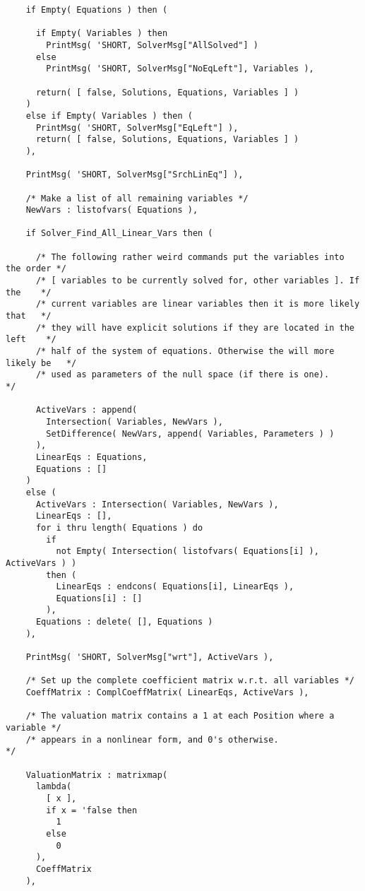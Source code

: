 \begin{verbatim}
    if Empty( Equations ) then (

      if Empty( Variables ) then
        PrintMsg( 'SHORT, SolverMsg["AllSolved"] )
      else
        PrintMsg( 'SHORT, SolverMsg["NoEqLeft"], Variables ),

      return( [ false, Solutions, Equations, Variables ] )
    )
    else if Empty( Variables ) then (
      PrintMsg( 'SHORT, SolverMsg["EqLeft"] ),
      return( [ false, Solutions, Equations, Variables ] )
    ),

    PrintMsg( 'SHORT, SolverMsg["SrchLinEq"] ),

    /* Make a list of all remaining variables */
    NewVars : listofvars( Equations ),

    if Solver_Find_All_Linear_Vars then (

      /* The following rather weird commands put the variables into the order */
      /* [ variables to be currently solved for, other variables ]. If the    */
      /* current variables are linear variables then it is more likely that   */
      /* they will have explicit solutions if they are located in the left    */
      /* half of the system of equations. Otherwise the will more likely be   */
      /* used as parameters of the null space (if there is one).              */

      ActiveVars : append(
        Intersection( Variables, NewVars ),
        SetDifference( NewVars, append( Variables, Parameters ) )
      ),
      LinearEqs : Equations,
      Equations : []
    )
    else (
      ActiveVars : Intersection( Variables, NewVars ),
      LinearEqs : [],
      for i thru length( Equations ) do
        if
          not Empty( Intersection( listofvars( Equations[i] ), ActiveVars ) )
        then (
          LinearEqs : endcons( Equations[i], LinearEqs ),
          Equations[i] : []
        ),
      Equations : delete( [], Equations )
    ),

    PrintMsg( 'SHORT, SolverMsg["wrt"], ActiveVars ),

    /* Set up the complete coefficient matrix w.r.t. all variables */
    CoeffMatrix : ComplCoeffMatrix( LinearEqs, ActiveVars ),

    /* The valuation matrix contains a 1 at each Position where a variable */
    /* appears in a nonlinear form, and 0's otherwise.                     */

    ValuationMatrix : matrixmap(
      lambda(
        [ x ],
        if x = 'false then
          1
        else
          0
      ),
      CoeffMatrix
    ),


\end{verbatim}
